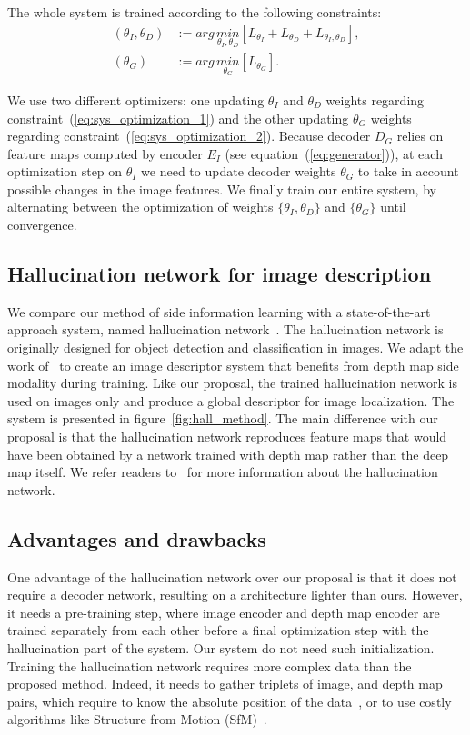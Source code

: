 The whole system is trained according to the following constraints:
\begin{align}
	\left( \theta_{I}, \theta_{D} \right) & := arg\,\underset{\theta_{I}, \theta_{D}}{min} \left[ L_{\theta_{I}} + L_{\theta_{D}} + L_{\theta_{I},\theta_{D}} \right], \label{eq:sys_optimization_1} \\ 	
	\left( \theta_{G} \right) & := arg\,\underset{\theta_{G}}{min} \left[ L_{\theta_{G}} \right]. 	\label{eq:sys_optimization_2}
\end{align}

We use two different optimizers: one updating $\theta_{I}$ and $\theta_{D}$ weights regarding constraint~(\ref{eq:sys_optimization_1}) and the other updating $\theta_{G}$ weights regarding constraint~(\ref{eq:sys_optimization_2}). Because decoder $D_G$ relies on feature maps computed by encoder $E_I$ (see equation~(\ref{eq:generator})), at each optimization step on $\theta_{I}$ we need to update decoder weights $\theta_{G}$ to take in account possible changes in the image features. We finally train our entire system, by alternating between the optimization of weights $\{\theta_{I}, \theta_{D}\}$ and $\{\theta_G\}$ until convergence.

\subsection{Hallucination network for image description}
\label{subsec:hall}
We compare our method of side information learning with a state-of-the-art approach system, named hallucination network~\cite{Hoffman2016}. The hallucination network is originally designed for object detection and classification in images. We adapt the work of~\cite{Hoffman2016} to create an image descriptor system that benefits from depth map side modality during training. Like our proposal, the trained hallucination network is used on images only and produce a global descriptor for image localization. The system is presented in figure~\ref{fig:hall_method}. The main difference with our proposal is that the hallucination network reproduces feature maps that would have been obtained by a network trained with depth map rather than the deep map itself. We refer readers to~\cite{Hoffman2016} for more information about the hallucination network.

\subsection{Advantages and drawbacks}
\label{subsec:adv}
One advantage of the hallucination network over our proposal is that it does not require a decoder network, resulting on a architecture lighter than ours. However, it needs a pre-training step, where image encoder and depth map encoder are trained separately from each other before a final optimization step with the hallucination part of the system. Our system do not need such initialization. Training the hallucination network requires more complex data than the proposed method. Indeed, it needs to gather triplets of image, and depth map pairs, which require to know the absolute position of the data~\cite{Arandjelovic2017,Liu2018}, or to use costly algorithms like Structure from Motion (SfM)~\cite{Godard2017,Radenovic2017,Kim2017a}. 

